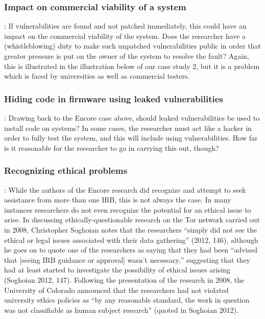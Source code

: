 \documentclass{svjour3}                     %
\begin{document}
\subsubsection{Impact on commercial viability of a system}:
If vulnerabilities are found and not patched immediately, this could have an impact on the commercial viability of the system.  Does the researcher have a (whistleblowing) duty to make such unpatched vulnerabilities public in order that greater pressure is put on the owner of the system to resolve the fault? Again, this is illustrated in the illustration below of our case study 2, but it is a problem which is faced by universities as well as commercial testers.

\subsubsection{Hiding code in firmware using leaked vulnerabilities}:
Drawing back to the Encore case above, should leaked vulnerabilities be used to install code on systems? In some cases, the researcher must act like a hacker in order to fully test the system, and this will include using vulnerabilities. How far is it reasonable for the researcher to go in carrying this out, though?

\subsubsection{Recognizing ethical problems}:
While the authors of the Encore research did recognize and attempt to seek assistance from more than one IRB, this is not always the case. In many instances researchers do not even recognize the potential for an ethical issue to arise. In discussing ethically-questionable research on the Tor network carried out in 2008, Christopher Soghoian notes that the researchers “simply did not see the ethical or legal issues associated with their data gathering” (2012, 146), although he goes on to quote one of the researchers as saying that they had been “advised that [seeing IRB guidance or approval] wasn’t necessary,” suggesting that they had at least started to investigate the possibility of ethical issues arising (Soghoian 2012, 147). Following the presentation of the research in 2008, the University of Colorado announced that the researchers had not violated university ethics policies as “by any reasonable standard, the work in question was not classifiable as human subject research” (quoted in Soghoian 2012).
\end{document}
